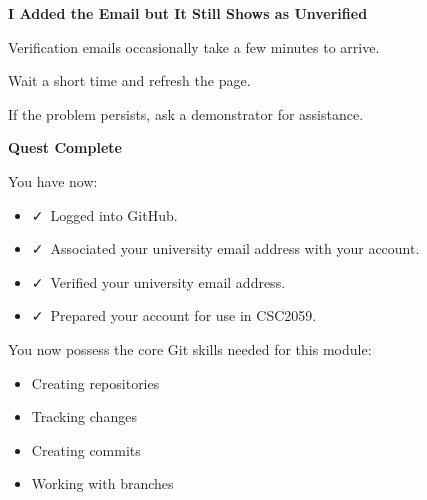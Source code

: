 \documentclass{csc2059practical}
\begin{document}
\begin{commonerror}
\textbf{I Added the Email but It Still Shows as Unverified}\par
\medskip

Verification emails occasionally take a few minutes to arrive.


Wait a short time and refresh the page.


If the problem persists, ask a demonstrator for assistance.


\end{commonerror}
\begin{wrapupbox}
\textbf{Quest Complete}\par
\medskip

You have now:


\begin{itemize}
  \item \faCheck\ Logged into GitHub.
\end{itemize}

\begin{itemize}
  \item \faCheck\ Associated your university email address with your account.
\end{itemize}

\begin{itemize}
  \item \faCheck\ Verified your university email address.
\end{itemize}

\begin{itemize}
  \item \faCheck\ Prepared your account for use in CSC2059.
\end{itemize}

You now possess the core Git skills needed for this module:


\begin{itemize}
  \item Creating repositories
\end{itemize}

\begin{itemize}
  \item Tracking changes
\end{itemize}

\begin{itemize}
  \item Creating commits
\end{itemize}

\begin{itemize}
  \item Working with branches
\end{itemize}


\end{wrapupbox}
\end{document}
